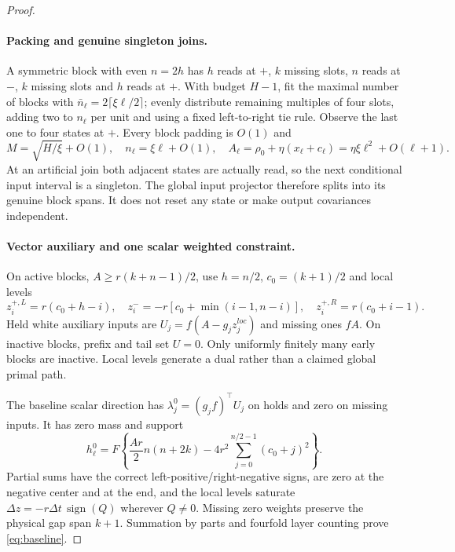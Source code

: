 \documentclass[11pt]{article}
\begin{document}
\begin{proof}
\paragraph{Packing and genuine singleton joins.}
A symmetric block with even $n=2h$ has $h$ reads at $+$, $k$ missing slots,
$n$ reads at $-$, $k$ missing slots and $h$ reads at $+$.
With budget $H-1$, fit the maximal number of blocks with
$\bar n_\ell=2\lceil\xi\ell/2\rceil$; evenly distribute remaining multiples of
four slots, adding two to $n_\ell$ per unit and using a fixed left-to-right
tie rule. Observe the last one to four states at $+$.
Every block padding is $O(1)$ and
\[
M=\sqrt{H/\xi}+O(1),\quad n_\ell=\xi\ell+O(1),\quad
A_\ell=\rho_0+\eta(x_\ell+c_\ell)=\eta\xi\ell^2+O(\ell+1).
\]
At an artificial join both adjacent states are actually read, so the next
conditional input interval is a singleton.
The global input projector therefore splits into its genuine block spans.
It does not reset any state or make output covariances independent.

\paragraph{Vector auxiliary and one scalar weighted constraint.}
On active blocks, $A\ge r(k+n-1)/2$, use $h=n/2$, $c_0=(k+1)/2$ and local levels
\[
z_i^{+,L}=r(c_0+h-i),\quad
z_i^-=-r[c_0+\min(i-1,n-i)],\quad
z_i^{+,R}=r(c_0+i-1).
\]
Held white auxiliary inputs are $U_j=f(A-g_jz_j^{loc})$ and missing ones $fA$.
On inactive blocks, prefix and tail set $U=0$.
Only uniformly finitely many early blocks are inactive.
Local levels generate a dual rather than a claimed global primal path.

The baseline scalar direction has $\lambda_j^0=(g_jf)^\top U_j$ on holds
and zero on missing inputs. It has zero mass and support
\begin{equation}\label{eq:baseline}
h_\ell^0=F\left\{\frac{Ar}{2}n(n+2k)
-4r^2\sum_{j=0}^{n/2-1}(c_0+j)^2\right\}.
\end{equation}
Partial sums have the correct left-positive/right-negative signs,
are zero at the negative center and at the end, and the local levels
saturate $\Delta z=-r\Delta t\,\operatorname{sign}(Q)$ wherever $Q\ne0$.
Missing zero weights preserve the physical gap span $k+1$.
Summation by parts and fourfold layer counting prove \eqref{eq:baseline}.


\end{proof}
\end{document}
